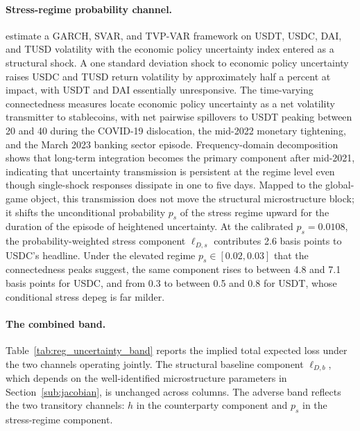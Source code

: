 \paragraph{Stress-regime probability channel.} \citet{alasadi_bewaji_gugnani_gupta_heijmans_2025} estimate a GARCH, SVAR, and TVP-VAR framework on USDT, USDC, DAI, and TUSD volatility with the \citet{baker_bloom_davis_2016} economic policy uncertainty index entered as a structural shock. A one standard deviation shock to economic policy uncertainty raises USDC and TUSD return volatility by approximately half a percent at impact, with USDT and DAI essentially unresponsive. The time-varying connectedness measures locate economic policy uncertainty as a net volatility transmitter to stablecoins, with net pairwise spillovers to USDT peaking between 20 and 40 during the COVID-19 dislocation, the mid-2022 monetary tightening, and the March 2023 banking sector episode. Frequency-domain decomposition shows that long-term integration becomes the primary component after mid-2021, indicating that uncertainty transmission is persistent at the regime level even though single-shock responses dissipate in one to five days. Mapped to the global-game object, this transmission does not move the structural microstructure block; it shifts the unconditional probability $p_s$ of the stress regime upward for the duration of the episode of heightened uncertainty. At the calibrated $p_s = 0.0108$, the probability-weighted stress component $\ell_{D,s}$ contributes 2.6 basis points to USDC's headline. Under the elevated regime $p_s \in [0.02, 0.03]$ that the connectedness peaks suggest, the same component rises to between 4.8 and 7.1 basis points for USDC, and from 0.3 to between 0.5 and 0.8 for USDT, whose conditional stress depeg is far milder.

\paragraph{The combined band.} Table~\ref{tab:reg_uncertainty_band} reports the implied total expected loss under the two channels operating jointly. The structural baseline component $\ell_{D,b}$, which depends on the well-identified microstructure parameters in Section~\ref{sub:jacobian}, is unchanged across columns. The adverse band reflects the two transitory channels: $h$ in the counterparty component and $p_s$ in the stress-regime component.

